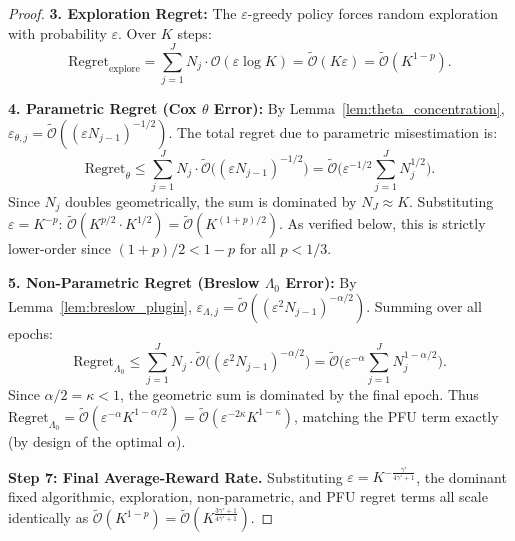 \documentclass[letterpaper, 10 pt, conference]{IEEEconf}
\begin{document}
\begin{proof}
    \noindent \textbf{3. Exploration Regret:}
    The $\varepsilon$-greedy policy forces random exploration with probability $\varepsilon$. Over $K$ steps:
    \begin{equation}
        \mathrm{Regret}_{\mathrm{explore}} = \sum_{j=1}^J N_j \cdot \mathcal{O}(\varepsilon \log K) = \widetilde{\mathcal{O}}(K \varepsilon) = \widetilde{\mathcal{O}}(K^{1-p}).
    \end{equation}

    \noindent \textbf{4. Parametric Regret (Cox $\theta$ Error):}
    By Lemma~\ref{lem:theta_concentration}, $\varepsilon_{\theta,j} = \widetilde{\mathcal{O}}((\varepsilon N_{j-1})^{-1/2})$. The total regret due to parametric misestimation is:
    \begin{equation}
        \mathrm{Regret}_{\theta} \le \sum_{j=1}^J N_j \cdot \widetilde{\mathcal{O}}\big((\varepsilon N_{j-1})^{-1/2}\big) = \widetilde{\mathcal{O}}\bigg(\varepsilon^{-1/2} \sum_{j=1}^J N_j^{1/2}\bigg).
    \end{equation}
    Since $N_j$ doubles geometrically, the sum is dominated by $N_J \approx K$. Substituting $\varepsilon = K^{-p}$: $\widetilde{\mathcal{O}}(K^{p/2} \cdot K^{1/2}) = \widetilde{\mathcal{O}}(K^{(1+p)/2})$. As verified below, this is strictly lower-order since $(1+p)/2 < 1-p$ for all $p < 1/3$.

    \noindent \textbf{5. Non-Parametric Regret (Breslow $\Lambda_0$ Error):}
    By Lemma~\ref{lem:breslow_plugin}, $\varepsilon_{\Lambda,j} = \widetilde{\mathcal{O}}((\varepsilon^2 N_{j-1})^{-\alpha/2})$. Summing over all epochs:
    \begin{equation}
        \mathrm{Regret}_{\Lambda_0} \le \sum_{j=1}^J N_j \cdot \widetilde{\mathcal{O}}\big((\varepsilon^2 N_{j-1})^{-\alpha/2}\big) = \widetilde{\mathcal{O}}\bigg(\varepsilon^{-\alpha} \sum_{j=1}^J N_j^{1-\alpha/2}\bigg).
    \end{equation}
    Since $\alpha/2 = \kappa < 1$, the geometric sum is dominated by the final epoch. Thus $\mathrm{Regret}_{\Lambda_0} = \widetilde{\mathcal{O}}(\varepsilon^{-\alpha} K^{1-\alpha/2}) = \widetilde{\mathcal{O}}(\varepsilon^{-2\kappa} K^{1-\kappa})$, matching the PFU term exactly (by design of the optimal $\alpha$).

    \textbf{Step 7: Final Average-Reward Rate.}
    Substituting $\varepsilon = K^{-\frac{\gamma'}{4\gamma'+1}}$, the dominant fixed algorithmic, exploration, non-parametric, and PFU regret terms all scale identically as $\widetilde{\mathcal{O}}(K^{1-p}) = \widetilde{\mathcal{O}}(K^{\frac{3\gamma'+1}{4\gamma'+1}})$.


\end{proof}
\end{document}
